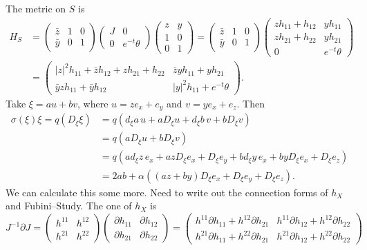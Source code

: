 \documentclass[10pt,a4paper]{amsart}
\begin{document}
The metric on $S$ is
\begin{align*}
H_S
&=
\begin{pmatrix}
\bar z & 1 & 0
\\
\bar y & 0 & 1
\end{pmatrix}
\begin{pmatrix}
J & 0
\\
0 & e^{-t}\theta
\end{pmatrix}
\begin{pmatrix}
z & y
\\
1 & 0
\\
0 & 1
\end{pmatrix}
=
\begin{pmatrix}
\bar z & 1 & 0
\\
\bar y & 0 & 1
\end{pmatrix}
\begin{pmatrix}
z h_{11} + h_{12} & y h_{11}
\\
z h_{21} + h_{22} & y h_{21}
\\
0 & e^{-t} \theta
\end{pmatrix}
\\
&=
\begin{pmatrix}
|z|^2 h_{11} + \bar z h_{12} + z h_{21} + h_{22} &
\bar z y h_{11} + y h_{21}
\\
\bar y z h_{11} + \bar y h_{12} &
|y|^2 h_{11} + e^{-t} \theta
\end{pmatrix}.
\end{align*}
Take $\xi = a u + bv$, where $u = ze_x + e_y$ and $v = ye_x + e_z$.
Then
\begin{align*}
\sigma(\xi)\xi =
q(D_\xi\xi)
&= q(d_\xi a \, u + a D_\xi u + d_\xi b \, v + b D_\xi v)
\\
&= q(a D_\xi u + b D_\xi v)
\\
&= q(a d_\xi z \, e_x + az D_\xi  e_x + D_\xi  e_y + b d_\xi y \, e_x + by D_\xi  e_x + D_\xi  e_z)
\\
&= 2ab
+ \alpha( (az + by) D_\xi e_x + D_\xi e_y + D_\xi e_z).
\end{align*}
We can calculate this some more.
Need to write out the connection forms of $h_X$ and Fubini--Study.
The one of $h_X$ is
$$
J^{-1} \partial J
=
\begin{pmatrix}
h^{11} & h^{12}
\\
h^{21} & h^{22}
\end{pmatrix}
\begin{pmatrix}
\partial h_{11} & \partial h_{12}
\\
\partial h_{21} & \partial h_{22}
\end{pmatrix}
=
\begin{pmatrix}
h^{11} \partial h_{11} {+} h^{12} \partial h_{21} &
h^{11} \partial h_{12} {+} h^{12} \partial h_{22}
\\
h^{21} \partial h_{11} {+} h^{22} \partial h_{21} &
h^{21} \partial h_{12} {+} h^{22} \partial h_{22}
\end{pmatrix}
$$
\end{document}
